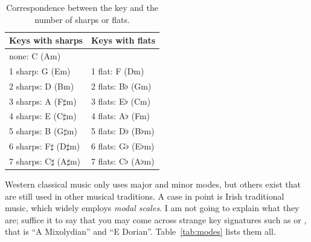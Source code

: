\documentclass[a4paper,fullpage,12pt]{book}
\begin{document}
\begin{table}[h]
\begin{center}
\begin{tabular}{ll}
\toprule %
\textbf{Keys with sharps} & \textbf{Keys with flats}\\
\midrule %
none: C (Am) & \\
1 sharp: G (Em) & 1 flat: F (Dm) \\
2 sharps: D (Bm) & 2 flats: B$\flat$ (Gm) \\
3 sharps: A (F$\sharp$m) & 3 flats: E$\flat$ (Cm) \\
4 sharps: E (C$\sharp$m) & 4 flats: A$\flat$ (Fm) \\
5 sharps: B (G$\sharp$m) & 5 flats: D$\flat$ (B$\flat$m) \\
6 sharps: F$\sharp$ (D$\sharp$m) & 6 flats: G$\flat$ (E$\flat$m) \\
7 sharps: C$\sharp$ (A$\sharp$m) & 7 flats: C$\flat$ (A$\flat$m) \\
\bottomrule %
\end{tabular}
\caption{Correspondence between the key and the number of sharps or
flats.} \label{tab:keys}
\end{center}
\end{table}

Western classical music only uses major and minor modes, but others
exist that are still used in other musical traditions. A case in point
is Irish traditional music, which widely employs \emph{modal scales}.
I am not going to explain what they are; suffice it to say that you
may come across strange key signatures such as  or
, that is ``A Mixolydian'' and ``E Dorian''.
Table~\ref{tab:modes} lists them all.
\end{document}

